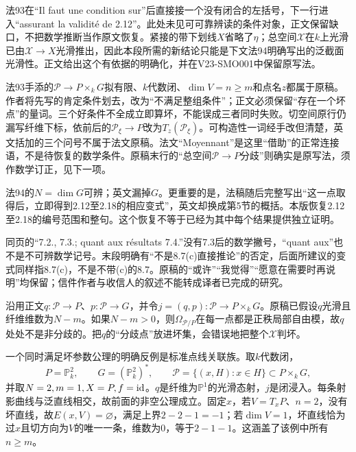 
法93在“Il faut une condition sur”后直接接一个没有闭合的左括号，下一行进入“assurant la validité de 2.12”。此处未见可可靠辨读的条件对象，正文保留缺口，不把数学推断当作原文恢复。紧接的带下划线$X$省略了$\eta$；总空间$\mathcal X$在$k$上光滑已由$\mathcal X\to X$光滑推出，因此本段所需的新结论只能是下文法94明确写出的泛截面光滑性。正文给出这个有依据的明确化，并在V23-SMO001中保留原写法。

法93手添的$\mathcal P\to P\times_kG$拟有限、$k$代数闭、$\dim V=n\geq m$和点名$z$都属于原稿。作者将先写的肯定条件划去，改为“不满足整组条件”；正文必须保留“存在一个坏点”的量词。三个好条件不全成立即算坏，不能误成三者同时失败。切空间原行仍漏写纤维下标，依前后的$\mathcal P_\xi\to P$改为$T_z(\mathcal P_\xi)$。可构造性一词经手改但清楚，英文括加的三个问号不属于法文原稿。法文“Moyennant”是这里“借助”的正常连接语，不是待恢复的数学条件。原稿末行的“总空间$\mathcal P\to P$分歧”则确实是原写法，须作数学订正，见下一项。

法94的$N=\dim G$可辨；英文漏掉$G$。更重要的是，法稿随后完整写出“这一点取得后，立即得到2.12至2.18的相应变式”，英文却换成第5节的概括。本版恢复2.12至2.18的编号范围和整句。这个恢复不等于已经为其中每个结果提供独立证明。

同页的“7.2., 7.3.; quant aux résultats 7.4.”没有7.3后的数学撇号，“quant aux”也不是不可辨数学记号。末段明确有“不是8.7(c)直接推论”的否定，后面所建议的变式同样指8.7(c)，不是不带(c)的8.7。原稿的“或许”“我觉得”“愿意在需要时再说明”均保留；信件作者与收信人的叙述不能转成译者已完成的研究。

沿用正文$q:\mathcal P\to P$、$p:\mathcal P\to G$，并令$j=(q,p):\mathcal P\to P\times_kG$。原稿已假设$q$光滑且纤维维数为$N-m$。如果$N-m>0$，则$\Omega_{\mathcal P/P}$在每一点都是正秩局部自由模，故$q$处处不是非分歧的。把$q$的“分歧点”放进坏集，会错误地把整个$\mathcal X$判坏。

一个同时满足坏参数公理的明确反例是标准点线关联族。取$k$代数闭，
\[
P=\mathbb P^2_k,\qquad G=(\mathbb P^2_k)^*,\qquad
\mathcal P=\{(x,H):x\in H\}\subset P\times_kG,
\]
并取$N=2,m=1,X=P,f=\mathrm{id}$。$q$是纤维为$\mathbb P^1$的光滑态射，$j$是闭浸入。每条射影曲线与泛直线相交，故前面的非空公理成立。固定$x$，若$V=T_xP$、$n=2$，没有坏直线，故$E(x,V)=\varnothing$，满足上界$2-2-1=-1$；若$\dim V=1$，坏直线恰为过$x$且切方向为$V$的唯一一条，维数为0，等于$2-1-1$。这涵盖了该例中所有$n\geq m$。

